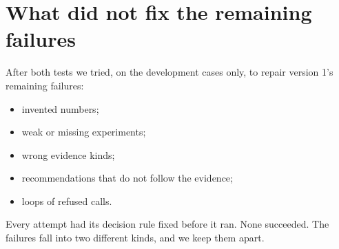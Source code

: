 \section{What did not fix the remaining failures}\label{sec:negative}
After both tests we tried, on the development cases only, to repair version 1's remaining failures:
\begin{itemize}
  \item invented numbers;
  \item weak or missing experiments;
  \item wrong evidence kinds;
  \item recommendations that do not follow the evidence;
  \item loops of refused calls.
\end{itemize}
Every attempt had its decision rule fixed before it ran. None succeeded. The failures fall into two different kinds,
and we keep them apart.

